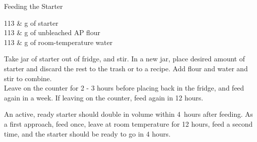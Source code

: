 \setHeadlines
{
}

\begin{recipe}
[ %
    source = Jim (and the rest of the internet),
]
{Feeding the Starter}

    \ingredients
    {
		113 & g of starter \\
		113 & g of unbleached AP flour \\
		113 & g of room-temperature water \\
    }
    
    \preparation
    {
        \step Take jar of starter out of fridge, and stir. In a new jar, place desired amount of starter and discard the rest to the trash or to a recipe. 
		\step Add flour and water and stir to combine. \\
		\step Leave on the counter for 2 - 3 hours before placing back in the fridge, and feed again in a week. If leaving on the counter, feed again in 12 hours. 
    }
	
	\suggestion
	{
		An active, ready starter should double in volume within 4~hours after feeding. As a first approach, feed once, leave at room temperature for 12 hours, feed a second time, and the starter should be ready to go in 4 hours.
	}

\end{recipe}
